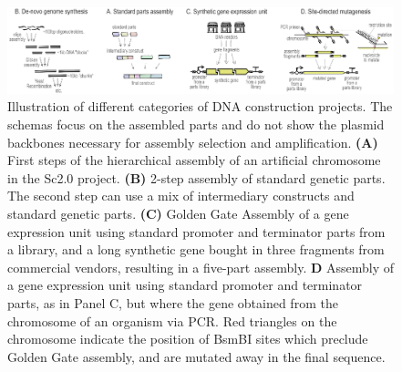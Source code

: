 
\begin{figure}[!tpb]
  \includegraphics[width=\textwidth]{figures/figure_1_dna_projects.eps}
  \caption{Illustration of different categories of DNA construction projects. The schemas focus on the assembled parts and do not show the plasmid backbones necessary for assembly selection and amplification. \textbf{(A)} First steps of the hierarchical assembly of an artificial chromosome in the Sc2.0 project.
\textbf{(B)} 2-step assembly of standard genetic parts. The second step can use a mix of intermediary constructs and standard genetic parts.
\textbf{(C)} Golden Gate Assembly of a gene expression unit using standard promoter and terminator parts from a library, and a long synthetic gene bought in three fragments from commercial vendors, resulting in a five-part assembly.
\textbf{D} Assembly of a gene expression unit using standard promoter and terminator parts, as in Panel C, but where the gene obtained from the chromosome of an organism via PCR. Red triangles on the chromosome indicate the position of BsmBI sites which preclude Golden Gate assembly, and are mutated away in the final sequence.}
  \label{dna_projects}
\end{figure}


